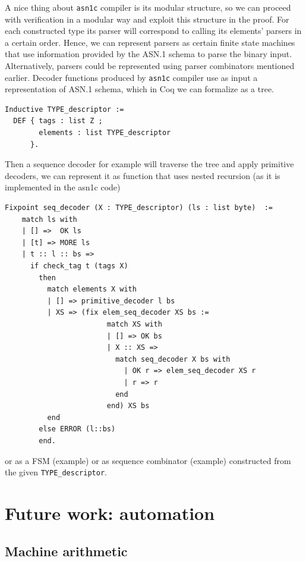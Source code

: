 \documentclass[acmsmall,nonacm]{acmart}
\begin{document}
A nice thing about \texttt{asn1c} compiler is its modular structure, so we can proceed with verification in a modular way and exploit this structure in the proof. For each constructed type its parser will correspond to calling its elements' parsers in a certain order. Hence, we can represent parsers as certain finite state machines that use information provided by the ASN.1 schema to parse the binary input. Alternatively, parsers could be represented using parser combinators mentioned earlier. Decoder functions produced by \texttt{asn1c} compiler use as input a representation of ASN.1 schema, which in Coq we can formalize as a tree.

 \begin{lstlisting}[language=Coq]
Inductive TYPE_descriptor :=
  DEF { tags : list Z ;
        elements : list TYPE_descriptor 
      }.
 \end{lstlisting}

Then a sequence decoder for example will traverse the tree and apply primitive decoders, we can represent it as function that uses nested recursion (as it is implemented in the asn1c code)
 
 \begin{lstlisting}[language=Coq]
 Fixpoint seq_decoder (X : TYPE_descriptor) (ls : list byte)  :=
    match ls with
    | [] =>  OK ls
    | [t] => MORE ls       
    | t :: l :: bs =>          
      if check_tag t (tags X)
        then
          match elements X with 
          | [] => primitive_decoder l bs 
          | XS => (fix elem_seq_decoder XS bs :=
                        match XS with
                        | [] => OK bs
                        | X :: XS =>
                          match seq_decoder X bs with
                            | OK r => elem_seq_decoder XS r 
                            | r => r
                          end
                        end) XS bs
          end
        else ERROR (l::bs)
        end.
 \end{lstlisting}

 or as a FSM (example) or as sequence combinator (example) constructed from the given \texttt{TYPE\_descriptor}.


\section{Future work: automation}


\subsection{Machine arithmetic}
\end{document}
